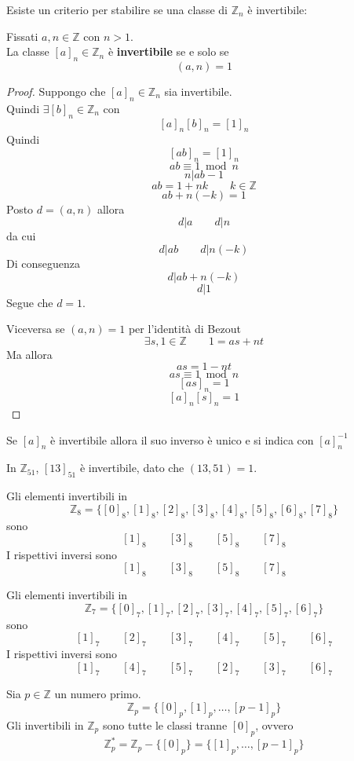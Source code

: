 \documentclass[a4paper,12pt, oneside]{book}
\begin{document}
		Esiste un criterio per stabilire se una classe di $\mathbb{Z}_n$ è invertibile:
		\begin{teorema}
			Fissati $a, n \in \mathbb{Z}$ con $n>1$.\\
			La classe $[a]_n \in \mathbb{Z}_n$ è \textbf{invertibile} se e solo se $$(a,n)=1$$
			
			\begin{proof}
				Suppongo che $[a]_n \in \mathbb{Z}_n$ sia invertibile.\\
				Quindi $\exists [b]_n \in \mathbb{Z}_n$ con $$[a]_n[b]_n=[1]_n$$
				Quindi
				$$[ab]_n = [1]_n$$
				$$ab \equiv 1 \bmod n$$
				$$n|ab-1$$
				$$ab=1+nk \qquad k \in \mathbb{Z}$$
				$$ab+n(-k) =1$$
				Posto $d = (a,n)$ allora $$d|a \qquad d|n$$ da cui $$d|ab \qquad d|n(-k)$$
				Di conseguenza $$d|ab+n(-k)$$ $$d|1$$
				Segue che $d=1$.
				
				Viceversa se $(a,n)=1$ per l'identità di Bezout $$\exists s,1 \in \mathbb{Z} \qquad 1=as+nt$$
				Ma allora $$as=1-nt$$ $$as \equiv 1 \bmod n$$ $$[as]_n= 1$$ $$[a]_n [s]_n = 1$$
			\end{proof}
		\end{teorema}
		\begin{osservazione}
			Se $[a]_n$ è invertibile allora il suo inverso è unico e si indica con $[a]_n^{-1}$
		\end{osservazione}
		\begin{shaded}
			\begin{esempio}
				In $\mathbb{Z}_{51}$, $[13]_{51}$ è invertibile, dato che $(13,51)=1$.
			\end{esempio}
			\begin{esempio}
				Gli elementi invertibili in $$\mathbb{Z}_8 = \{ [0]_8, [1]_8, [2]_8, [3]_8, [4]_8, [5]_8, [6]_8, [7]_8 \}$$ sono
				$$[1]_8 \qquad [3]_8 \qquad [5]_8 \qquad [7]_8$$
				I rispettivi inversi sono
				$$[1]_8 \qquad [3]_8 \qquad [5]_8 \qquad [7]_8$$
			\end{esempio}
			\begin{esempio}
				Gli elementi invertibili in $$\mathbb{Z}_7 = \{ [0]_7, [1]_7, [2]_7, [3]_7, [4]_7, [5]_7, [6]_7 \}$$ sono
				$$[1]_7 \qquad [2]_7 \qquad [3]_7 \qquad [4]_7 \qquad [5]_7 \qquad [6]_7$$
				I rispettivi inversi sono
				$$[1]_7 \qquad [4]_7 \qquad [5]_7 \qquad [2]_7 \qquad [3]_7 \qquad [6]_7$$
				
				\begin{nota}
					Sia $p \in \mathbb{Z}$ un numero primo.
					$$\mathbb{Z}_p = \{ [0]_p, [1]_p, \dots, [p-1]_p \}$$
					Gli invertibili in $\mathbb{Z}_p$ sono tutte le classi tranne $[0]_p$, ovvero
					$$\mathbb{Z}_p^{*} = \mathbb{Z}_p - \{ [0]_p \} = \{ [1]_p, \dots, [p-1]_p \}$$
				\end{nota}
			\end{esempio}
		\end{shaded}
\end{document}
